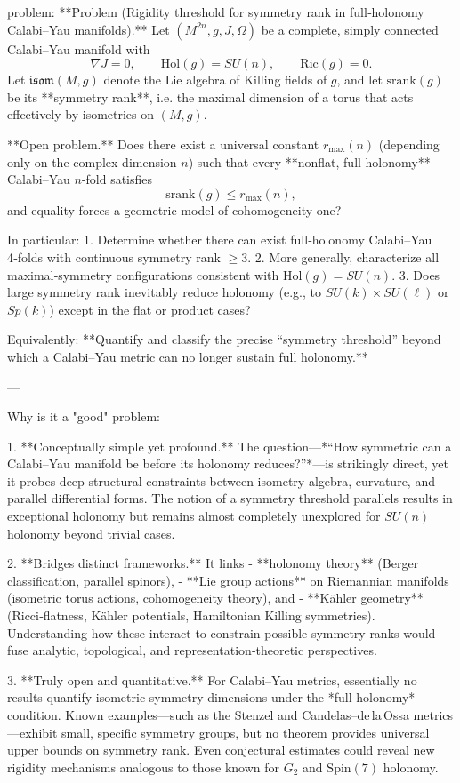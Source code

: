 problem:  
**Problem (Rigidity threshold for symmetry rank in full‑holonomy Calabi–Yau manifolds).**  
Let \((M^{2n},g,J,\Omega)\) be a complete, simply connected Calabi–Yau manifold with  
\[
\nabla J=0,\qquad \mathrm{Hol}(g)=SU(n),\qquad \mathrm{Ric}(g)=0.
\]  
Let \(\mathfrak{isom}(M,g)\) denote the Lie algebra of Killing fields of \(g\), and let \(\mathrm{srank}(g)\) be its **symmetry rank**, i.e. the maximal dimension of a torus that acts effectively by isometries on \((M,g)\).

**Open problem.**  
Does there exist a universal constant \(r_{\max}(n)\) (depending only on the complex dimension \(n\)) such that every **nonflat, full‑holonomy** Calabi–Yau \(n\)-fold satisfies  
\[
\mathrm{srank}(g)\le r_{\max}(n),
\]  
and equality forces a geometric model of cohomogeneity one?

In particular:
1. Determine whether there can exist full‑holonomy Calabi–Yau 4‑folds with continuous symmetry rank \(\ge 3\).  
2. More generally, characterize all maximal‑symmetry configurations consistent with \(\mathrm{Hol}(g)=SU(n)\).  
3. Does large symmetry rank inevitably reduce holonomy (e.g., to \(SU(k)\times SU(\ell)\) or \(Sp(k)\)) except in the flat or product cases?

Equivalently: **Quantify and classify the precise “symmetry threshold” beyond which a Calabi–Yau metric can no longer sustain full holonomy.**

---

Why is it a "good" problem:  

1. **Conceptually simple yet profound.**  
   The question—*“How symmetric can a Calabi–Yau manifold be before its holonomy reduces?”*—is strikingly direct, yet it probes deep structural constraints between isometry algebra, curvature, and parallel differential forms. The notion of a symmetry threshold parallels results in exceptional holonomy but remains almost completely unexplored for \(SU(n)\) holonomy beyond trivial cases.

2. **Bridges distinct frameworks.**  
   It links  
   - **holonomy theory** (Berger classification, parallel spinors),  
   - **Lie group actions** on Riemannian manifolds (isometric torus actions, cohomogeneity theory), and  
   - **Kähler geometry** (Ricci‑flatness, Kähler potentials, Hamiltonian Killing symmetries).  
   Understanding how these interact to constrain possible symmetry ranks would fuse analytic, topological, and representation‑theoretic perspectives.

3. **Truly open and quantitative.**  
   For Calabi–Yau metrics, essentially no results quantify isometric symmetry dimensions under the *full holonomy* condition. Known examples—such as the Stenzel and Candelas–de la Ossa metrics—exhibit small, specific symmetry groups, but no theorem provides universal upper bounds on symmetry rank. Even conjectural estimates could reveal new rigidity mechanisms analogous to those known for \(G_2\) and \(\mathrm{Spin}(7)\) holonomy.

